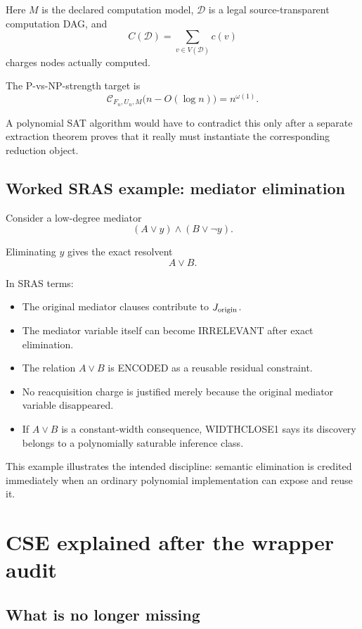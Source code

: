 \documentclass[11pt]{article}
\theoremstyle{plain}
\theoremstyle{definition}
\theoremstyle{remark}
\begin{document}
Here $M$ is the declared computation model, $\mathcal D$ is a legal
source-transparent computation DAG, and
\[
C(\mathcal D)=\sum_{v\in V(\mathcal D)}c(v)
\]
charges nodes actually computed.

The P-vs-NP-strength target is
\[
\boxed{
\mathcal C_{F_n,U_n,M}
\bigl(n-O(\log n)\bigr)
=
n^{\omega(1)}.
}
\]

A polynomial SAT algorithm would have to contradict this only after a separate
extraction theorem proves that it really must instantiate the corresponding
reduction object.

\subsection{Worked SRAS example: mediator elimination}

Consider a low-degree mediator
\[
(A\vee y)\wedge(B\vee\neg y).
\]

Eliminating $y$ gives the exact resolvent
\[
A\vee B.
\]

In SRAS terms:

\begin{itemize}[leftmargin=1.4em]
\item The original mediator clauses contribute to $J_{\rm origin}$.
\item The mediator variable itself can become IRRELEVANT after exact elimination.
\item The relation $A\vee B$ is ENCODED as a reusable residual constraint.
\item No reacquisition charge is justified merely because the original
mediator variable disappeared.
\item If $A\vee B$ is a constant-width consequence, WIDTHCLOSE1 says its
discovery belongs to a polynomially saturable inference class.
\end{itemize}

This example illustrates the intended discipline:
semantic elimination is credited immediately when an ordinary polynomial
implementation can expose and reuse it.

\section{CSE explained after the wrapper audit}

\subsection{What is no longer missing}
\end{document}
